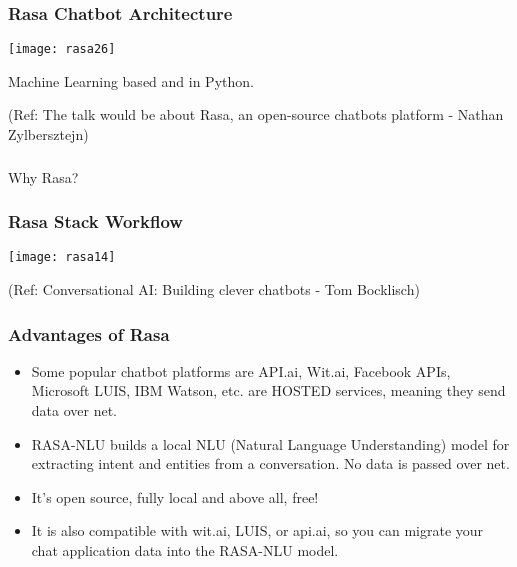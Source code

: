 \begin{frame}[fragile]\frametitle{Rasa Chatbot Architecture}


\begin{center}
\texttt{[image: rasa26]}
\end{center}

Machine Learning based and in Python.

{\tiny (Ref: The talk would be about Rasa, an open-source chatbots platform - Nathan Zylbersztejn)}

\end{frame}


\begin{frame}[fragile]\frametitle{}
\begin{center}
{\Large Why Rasa?}
\end{center}
\end{frame}

\begin{frame}[fragile]\frametitle{Rasa Stack Workflow}


\begin{center}
\texttt{[image: rasa14]}
\end{center}


{\tiny (Ref: Conversational AI: Building clever chatbots - Tom Bocklisch)}

\end{frame}


 \begin{frame}[fragile]\frametitle{Advantages of Rasa}
\begin{itemize}
\item Some popular chatbot platforms are API.ai, Wit.ai, Facebook APIs, Microsoft LUIS, IBM Watson, etc. are HOSTED services, meaning they send data over net.
\item RASA-NLU builds a local NLU (Natural Language Understanding) model for extracting intent and entities from a conversation. No data is passed over net.
\item It's open source, fully local and above all, free! 
\item It is also compatible with wit.ai, LUIS, or api.ai, so you can migrate your chat application data into the RASA-NLU model.
\end{itemize}
\end{frame}

